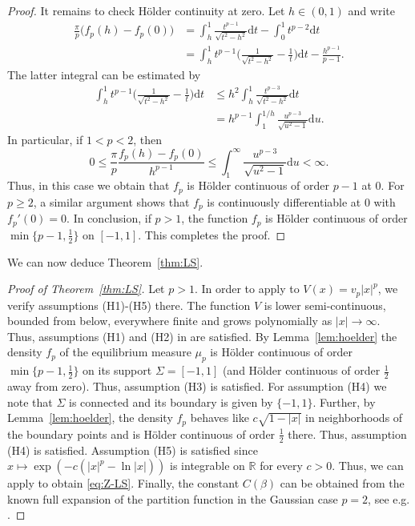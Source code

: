 \documentclass[a4paper,12pt,reqno]{amsart}
\theoremstyle{definition}
\newcommand{\IR}{\mathbb{R}}
\newcommand{\dd}{\mathrm{d}}
\begin{document}
\begin{proof}
It remains to check Hölder continuity at zero. Let $h\in (0,1)$ and write
\begin{align*}
\frac{\pi}{p}\big(f_p(h)-f_p(0)\big)
&=\int_h^1 \frac{t^{p-1}}{\sqrt{t^2-h^2}}\dd t - \int_0^1 t^{p-2}\dd t\\
&=\int_h^1 t^{p-1}\Big(\frac{1}{\sqrt{t^2-h^2}}-\frac{1}{t}\Big)\dd t -\frac{h^{p-1}}{p-1}.
\end{align*}
The latter integral can be estimated by
\begin{align*}
\int_h^1 t^{p-1}\Big(\frac{1}{\sqrt{t^2-h^2}}-\frac{1}{t}\Big)\dd t
&\le h^2\int_h^1 \frac{t^{p-3}}{\sqrt{t^2-h^2}}\dd t\\
&= h^{p-1}\int_1^{1/h} \frac{u^{p-3}}{\sqrt{u^2-1}}\dd u.
\end{align*}
In particular, if $1< p<2$, then
\begin{equation} \label{eq:hoelder}
0\le \frac{\pi}{p}\frac{f_p(h)-f_p(0)}{h^{p-1}}
\le \int_1^{\infty} \frac{u^{p-3}}{\sqrt{u^2-1}}\dd u
<\infty.
\end{equation}
Thus, in this case we obtain that $f_p$ is Hölder continuous of order $p-1$ at $0$. For $p\ge 2$, a similar argument shows that $f_p$ is continuously differentiable at $0$ with $f_p'(0)=0$. In conclusion, if $p>1$, the function $f_p$ is Hölder continuous of order $\min\{p-1,\frac{1}{2}\}$ on $[-1,1]$. This completes the proof.
\end{proof}

We can now deduce Theorem~\ref{thm:LS}.

\begin{proof}[Proof of Theorem~\ref{thm:LS}]
	Let $p>1$. In order to apply \cite[Cor.~1.1]{LS17} to $V(x)=v_p|x|^p$, we verify assumptions (H1)-(H5) there. The function $V$ is lower semi-continuous, bounded from below, everywhere finite and grows polynomially as $|x|\to \infty$. Thus, assumptions (H1) and (H2) in \cite{LS17} are satisfied. By Lemma~\ref{lem:hoelder} the density $f_p$ of the equilibrium measure $\mu_p$ is Hölder continuous of order $\min\{p-1,\frac{1}{2}\}$ on its support $\Sigma=[-1,1]$ (and Hölder continuous of order $\frac{1}{2}$ away from zero). Thus, assumption (H3) is satisfied. For assumption (H4) we note that $\Sigma$ is connected and its boundary is given by $\{-1,1\}$. Further, by Lemma~\ref{lem:hoelder}, the density $f_p$ behaves like $c\sqrt{1-|x|}$ in neighborhoods of the boundary points and is Hölder continuous of order $\frac{1}{2}$ there. Thus, assumption (H4) is satisfied. Assumption (H5) is satisfied since $x\mapsto \exp(-c(|x|^p-\ln |x|))$ is integrable on $\IR$ for every $c>0$. Thus, we can apply \cite[Cor.~1.1]{LS17} to obtain \eqref{eq:Z-LS}.  Finally, the constant $C(\beta)$ can be obtained from the known full expansion of the partition function in the Gaussian case $p=2$, see e.g. \cite[Sec.~7]{BG24}. 
\end{proof}
\end{document}
